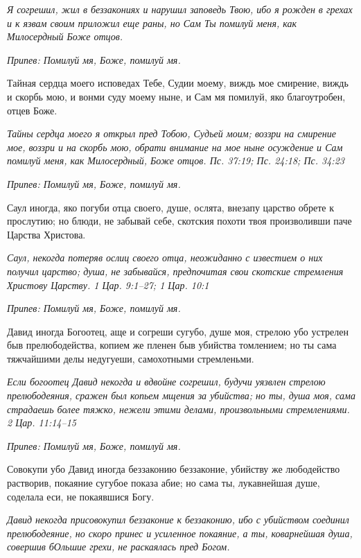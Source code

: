 \itshape Я согрешил, жил в беззакониях и нарушил заповедь Твою, ибо я рожден в грехах и к язвам своим приложил еще раны, но Сам Ты помилуй меня, как Милосердный Боже отцов.\normalfont{}


\itshape Припев:\normalfont{} Помилуй мя, Боже, помилуй мя.


Тайная сердца моего исповедах Тебе, Судии моему, виждь мое смирение, виждь и скорбь мою, и вонми суду моему ныне, и Сам мя помилуй, яко благоутробен, отцев Боже.


\itshape Тайны сердца моего я открыл пред Тобою, Судьей моим; воззри на смирение мое, воззри и на скорбь мою, обрати внимание на мое ныне осуждение и Сам помилуй меня, как Милосердный, Боже отцов. Пс. 37:19; Пс. 24:18; Пс. 34:23\normalfont{}


\itshape Припев:\normalfont{} Помилуй мя, Боже, помилуй мя.


Саул иногда, яко погуби отца своего, душе, ослята, внезапу царство обрете к прослутию; но блюди, не забывай себе, скотския похоти твоя произволивши паче Царства Христова.


\itshape Саул, некогда потеряв ослиц своего отца, неожиданно с известием о них получил царство; душа, не забывайся, предпочитая свои скотские стремления Христову Царству. 1 Цар. 9:1–27; 1 Цар. 10:1\normalfont{}


\itshape Припев:\normalfont{} Помилуй мя, Боже, помилуй мя.


Давид иногда Богоотец, аще и согреши сугубо, душе моя, стрелою убо устрелен быв прелюбодейства, копием же пленен быв убийства томлением; но ты сама тяжчайшими делы недугуеши, самохотными стремленьми.


\itshape Если богоотец Давид некогда и вдвойне согрешил, будучи уязвлен стрелою прелюбодеяния, сражен был копьем мщения за убийства; но ты, душа моя, сама страдаешь более тяжко, нежели этими делами, произвольными стремлениями. 2 Цар. 11:14–15\normalfont{}


\itshape Припев:\normalfont{} Помилуй мя, Боже, помилуй мя.


Совокупи убо Давид иногда беззаконию беззаконие, убийству же любодейство растворив, покаяние сугубое показа абие; но сама ты, лукавнейшая душе, соделала еси, не покаявшися Богу.


\itshape Давид некогда присовокупил беззаконие к беззаконию, ибо с убийством соединил прелюбодеяние, но скоро принес и усиленное покаяние, а ты, коварнейшая душа, совершив бОльшие грехи, не раскаялась пред Богом.\normalfont{}


